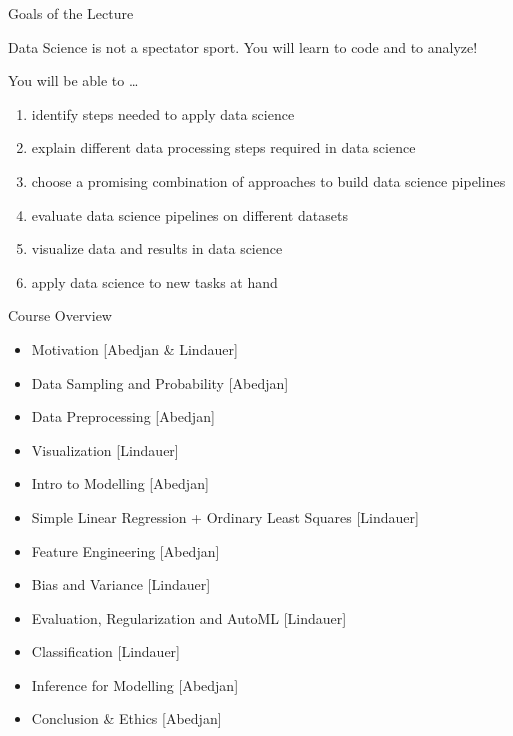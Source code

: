 \documentclass[aspectratio=169]{../latex_main/tntbeamer}  %
\begin{document}
\begin{frame}[c]{Goals of the Lecture}

Data Science is not a spectator sport.
You will learn to code and to analyze!

You will be able to \ldots
\begin{enumerate}
  \item \alert{identify} steps needed to apply data science
  \pause
  \item \alert{explain} different data processing steps required in data science
  \pause
  \item \alert{choose} a promising combination of approaches to build data science pipelines
  \pause
  \item \alert{evaluate} data science pipelines on different datasets
  \pause
  \item \alert{visualize} data and results in data science
  \pause
  \item \alert{apply} data science to new tasks at hand
\end{enumerate}

\end{frame}
\begin{frame}[c]{Course Overview}

\begin{itemize} 
    \item Motivation [Abedjan \& Lindauer] %
	\item Data Sampling and Probability [Abedjan] %
	\item Data Preprocessing [Abedjan] %
	\item Visualization [Lindauer] %
	\pause
	\item Intro to Modelling [Abedjan] %
	\item Simple Linear Regression + Ordinary Least Squares [Lindauer] %
	\pause
	\item Feature Engineering [Abedjan] %
	\item Bias and Variance [Lindauer] %
	\item Evaluation, Regularization and AutoML [Lindauer] %
	\pause
	\item Classification [Lindauer] %
	\item Inference for Modelling [Abedjan] %
	\pause
	\item Conclusion \& Ethics [Abedjan] %
\end{itemize}


\end{frame}
\end{document}
